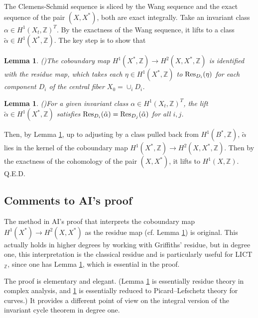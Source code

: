 \documentclass[12pt]{amsart}
\newcommand{\Z}{\mathbb{Z}}
\newtheorem{lemma}[theorem]{Lemma}
\begin{document}
The Clemens-Schmid sequence is sliced by the Wang sequence and the exact sequence of the pair $(X,X^*)$, both are exact integrally. Take an invariant class $\alpha\in H^1(X_t,\Z)^T$. By the exactness of the Wang sequence, it lifts to a class $\tilde{\alpha}\in H^1(X^*,\Z)$. The key step is to show that

\begin{lemma}(\cite[Step 2]{AI})\label{lemma_1}
    The coboundary map $H^1(X^*,\Z)\to H^2(X,X^*,\Z)$ is identified with the residue map, which takes each $\eta\in H^1(X^*,\Z)$ to $\textup{Res}_{D_i}(\eta)$ for each component $D_i$ of the central fiber $X_0=\cup_iD_i$.
\end{lemma}
\begin{lemma}(\cite[Step 2]{AI})\label{lemma_2}
    For a given invariant class $\alpha\in H^1(X_t,\Z)^T$, the lift $\tilde{\alpha}\in H^1(X^*,\Z)$ satisfies $\textup{Res}_{D_i}(\tilde{\alpha})=\textup{Res}_{D_j}(\tilde{\alpha})$ for all $i,j$.
\end{lemma}

Then, by Lemma \ref{lemma_2}, up to adjusting by a class pulled back from $H^1(B^*,\Z)$, $\tilde{\alpha}$ lies in the kernel of the coboundary map $H^1(X^*,\Z)\to H^2(X,X^*,\Z)$. Then by the exactness of the cohomology of the pair $(X,X^*)$, it lifts to $H^1(X,\Z)$. Q.E.D.


\subsection{Comments to AI's proof}
The method in AI's proof that interprets the coboundary map $H^1(X^*)\to H^2(X,X^*)$ as the residue map (cf. Lemma \ref{lemma_1}) is original. This actually holds in higher degrees by working with Griffiths' residue, but in degree one, this interpretation is the classical residue and is particularly useful for LICT$_\Z$, since one has Lemma \ref{lemma_2}, which is essential in the proof.

The proof is elementary and elegant. (Lemma \ref{lemma_1} is essentially residue theory in complex analysis, and \ref{lemma_2} is essentially reduced to Picard--Lefschetz theory for curves.) It provides a different point of view on the integral version of the invariant cycle theorem in degree one.






\end{document}
